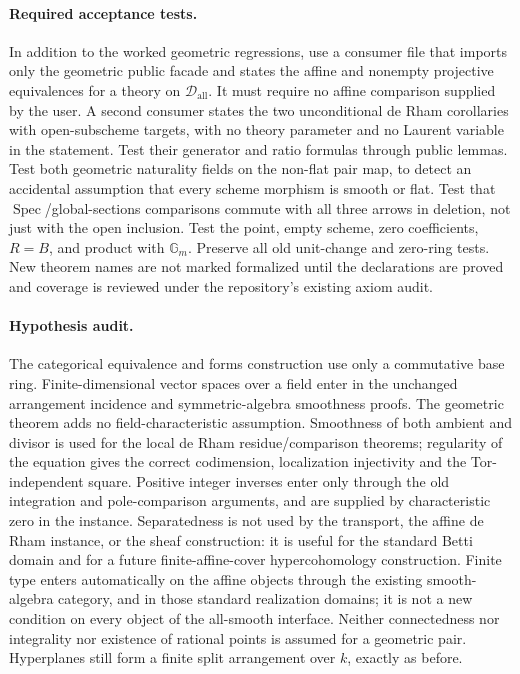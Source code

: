 \documentclass[11pt]{article}
\newcommand{\Gm}{{\mathbb G_m}}
\newcommand{\Spec}{\operatorname{Spec}}
\theoremstyle{definition}
\theoremstyle{remark}
\newcommand{\Dom}{\mathcal D}
\renewcommand{\Spec}{\ensuremath{\operatorname{Spec}}}
\begin{document}
\paragraph{Required acceptance tests.}
In addition to the worked geometric regressions, use a consumer file that imports only the geometric public facade and states the affine and nonempty projective equivalences for a theory on $\Dom_{\mathrm{all}}$. It must require no affine comparison supplied by the user. A second consumer states the two unconditional de Rham corollaries with open-subscheme targets, with no theory parameter and no Laurent variable in the statement. Test their generator and ratio formulas through public lemmas. Test both geometric naturality fields on the non-flat pair map, to detect an accidental assumption that every scheme morphism is smooth or flat. Test that \Spec/global-sections comparisons commute with all three arrows in deletion, not just with the open inclusion. Test the point, empty scheme, zero coefficients, $R=B$, and product with $\Gm$. Preserve all old unit-change and zero-ring tests. New theorem names are not marked formalized until the declarations are proved and coverage is reviewed under the repository's existing axiom audit.

\paragraph{Hypothesis audit.}
The categorical equivalence and forms construction use only a commutative base ring. Finite-dimensional vector spaces over a field enter in the unchanged arrangement incidence and symmetric-algebra smoothness proofs. The geometric theorem adds no field-characteristic assumption. Smoothness of both ambient and divisor is used for the local de Rham residue/comparison theorems; regularity of the equation gives the correct codimension, localization injectivity and the Tor-independent square. Positive integer inverses enter only through the old integration and pole-comparison arguments, and are supplied by characteristic zero in the instance. Separatedness is not used by the transport, the affine de Rham instance, or the sheaf construction: it is useful for the standard Betti domain and for a future finite-affine-cover hypercohomology construction. Finite type enters automatically on the affine objects through the existing smooth-algebra category, and in those standard realization domains; it is not a new condition on every object of the all-smooth interface. Neither connectedness nor integrality nor existence of rational points is assumed for a geometric pair. Hyperplanes still form a finite split arrangement over $k$, exactly as before.
\end{document}
